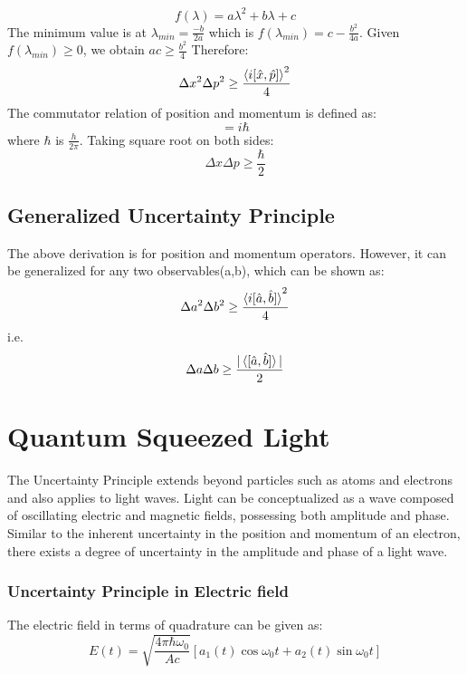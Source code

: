 \documentclass{article}
\begin{document}
\begin{equation}
f(\lambda)=a\lambda^2 + b\lambda+c    
\end{equation}
The minimum value is at $\lambda_{min}=\frac{-b}{2a}$ which is $f(\lambda_{min})=c-\frac{b^2}{4a}$. Given $f(\lambda_{min}) \geq 0$, we obtain $ac\geq\frac{b^2}{4}$
Therefore:
\begin{equation}
\Delta x^2 \Delta p^2 \geq \frac{\braket{i[\hat{x},\hat{p}]}^2}{4}     
\end{equation}
The commutator relation of position and momentum is defined as: 
\begin{equation}
[\hat{x},\hat{p}]=i\hbar    
\end{equation}
where $\hbar$ is $\frac{h}{2\pi}$. Taking square root on both sides:
\begin{equation}
\Delta x \Delta p \geq \frac{\hbar}{2}    
\end{equation}

\subsection*{Generalized Uncertainty Principle}

The above derivation is for position and momentum operators. However, it can be generalized for any two observables(a,b), which can be shown as\cite{mmoore}:
\begin{equation}
\Delta a^2 \Delta b^2 \geq \frac{\braket{i[\hat{a},\hat{b}]}^2}{4}      
\end{equation}
i.e.
\begin{equation}
\Delta a \Delta b \geq \frac{|\braket{[\hat{a},\hat{b}]}|}{2}      
\end{equation}

\section{Quantum Squeezed Light}

The Uncertainty Principle extends beyond particles such as atoms and electrons and also applies to light waves. Light can be conceptualized as a wave composed of oscillating electric and magnetic fields, possessing both amplitude and phase. Similar to the inherent uncertainty in the position and momentum of an electron, there exists a degree of uncertainty in the amplitude and phase of a light wave.

\subsubsection*{Uncertainty Principle in Electric field}
The electric field in terms of quadrature can be given as\cite{phdthesis_eric}:
\begin{equation}
\boxed{
E(t)=\sqrt{\frac{4\pi \hbar \omega_0}{Ac}}[a_1(t)\cos{\omega_0 t}+a_2(t)\sin{\omega_0 t}]
}
\end{equation}
\end{document}

